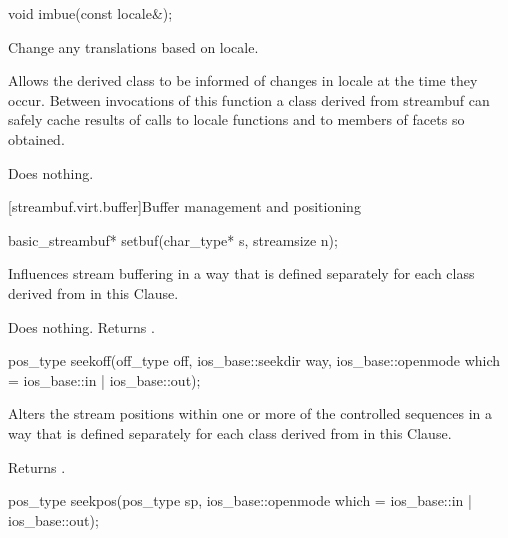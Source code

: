 %
\begin{itemdecl}
void imbue(const locale&);
\end{itemdecl}

\begin{itemdescr}
\pnum
\effects
Change any translations based on locale.

\pnum
\remarks
Allows the derived class to be informed of changes in locale at the
time they occur.
Between invocations of this function a class derived
from streambuf can safely cache results of calls to locale functions
and to members of facets so obtained.

\pnum
{}
Does nothing.
\end{itemdescr}

[streambuf.virt.buffer]{Buffer management and positioning}

%
\begin{itemdecl}
basic_streambuf* setbuf(char_type* s, streamsize n);
\end{itemdecl}

\begin{itemdescr}
\pnum
\effects
Influences stream buffering in a way that is defined separately for each class
derived from
in this Clause.

\pnum
{}
Does nothing.
Returns
.
\end{itemdescr}

%
\begin{itemdecl}
pos_type seekoff(off_type off, ios_base::seekdir way,
                 ios_base::openmode which
                  = ios_base::in | ios_base::out);
\end{itemdecl}

\begin{itemdescr}
\pnum
\effects
Alters the stream positions within one or more of
the controlled sequences in a way that is defined separately for each class
derived from
in this Clause.

\pnum
{}
Returns
.
\end{itemdescr}

%
\begin{itemdecl}
pos_type seekpos(pos_type sp,
                 ios_base::openmode which
                  = ios_base::in | ios_base::out);
\end{itemdecl}

